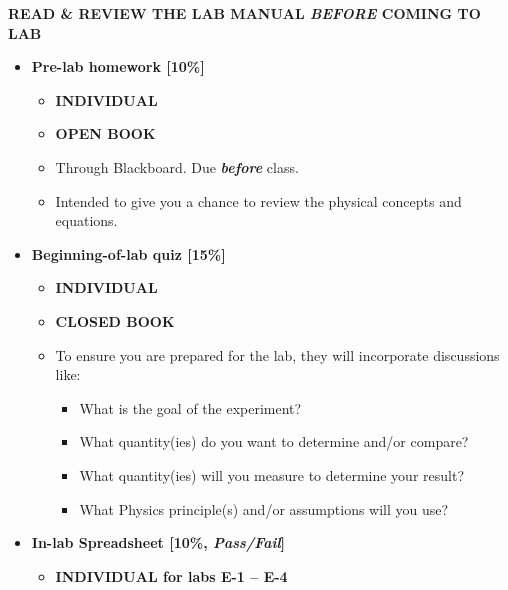 

\textbf{READ \& REVIEW THE LAB MANUAL \textit{BEFORE} COMING TO LAB}



\begin{itemize}
    \item \textbf{Pre-lab homework [10\%]}
    \begin{itemize}
        \item \textbf{INDIVIDUAL}
        \item \textbf{OPEN BOOK}
        \item Through Blackboard. Due \textbf{\textit{before}} class.
        \item Intended to give you a chance to review the physical concepts and equations.
    \end{itemize}
    \item \textbf{Beginning-of-lab quiz [15\%]}
        \begin{itemize}
            \item \textbf{INDIVIDUAL}
            \item \textbf{CLOSED BOOK}
            \item To ensure you are prepared for the lab, they will incorporate discussions like:
            \begin{itemize}
                \item What is the goal of the experiment?
                \item What quantity(ies) do you want to determine and/or compare?
                \item What quantity(ies) will you measure to determine your result?
                \item What Physics principle(s) and/or assumptions will you use?
            \end{itemize}
        \end{itemize}
    \item \textbf{In-lab Spreadsheet [10\%, \textit{Pass/Fail}]}
        \begin{itemize}
            \item  \textbf{INDIVIDUAL for labs E-1 -- E-4}

\end{itemize}
\end{itemize}
